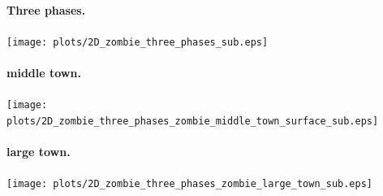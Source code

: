 \documentclass[%
twoside,                 %
final,                   %
10pt]{article}
\begin{document}
\paragraph{Three phases.}
\begin{center}  %
  \centerline{\texttt{[image: plots/2D\_zombie\_three\_phases\_sub.eps]}}
\end{center}


\paragraph{middle town.}
\begin{center}  %
  \centerline{\texttt{[image: plots/2D\_zombie\_three\_phases\_zombie\_middle\_town\_surface\_sub.eps]}}
\end{center}


\paragraph{large town.}
\begin{center}  %
  \centerline{\texttt{[image: plots/2D\_zombie\_three\_phases\_zombie\_large\_town\_sub.eps]}}
\end{center}
\end{document}
